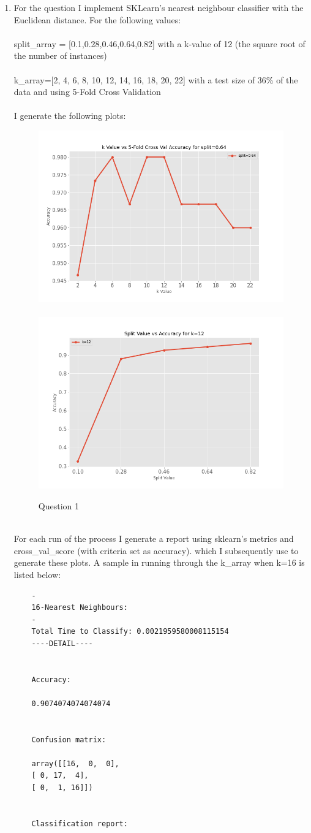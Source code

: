 \documentclass{article}
\begin{document}
\begin{enumerate}
	\item For the question I implement SKLearn's nearest neighbour classifier with the Euclidean distance. For the following values:\\
	\\
	split\_array = [0.1,0.28,0.46,0.64,0.82] with a k-value of 12 (the square root of the number of instances)
	\\
	\\
	k\_array=[2, 4, 6, 8, 10, 12, 14, 16, 18, 20, 22] with a test size of 36\% of the data and using 5-Fold Cross Validation\\
	\\
	I generate the following plots:
		\begin{figure}[h!]
		\centering
		\includegraphics[width=0.4\linewidth]{k_vs_accuracy.png}\
		\includegraphics[width=0.4\linewidth]{split_vs_accuracy.png}
		\caption{Question 1}\label{tfidf}
	\end{figure}
\\
For each run of the process I generate a report using sklearn's metrics and cross\_val\_score (with criteria set as accuracy). which I subsequently use to generate these plots. A sample in running through the k\_array when k=16 is listed below:
\newpage
\begin{verbatim}
	-
	16-Nearest Neighbours:
	-
	Total Time to Classify: 0.0021959580008115154
	----DETAIL----
	
	
	Accuracy: 
	
	0.9074074074074074
	
	
	Confusion matrix: 
	
	array([[16,  0,  0],
	[ 0, 17,  4],
	[ 0,  1, 16]])
	
	
	Classification report:
	

\end{verbatim}
\end{enumerate}
\end{document}
